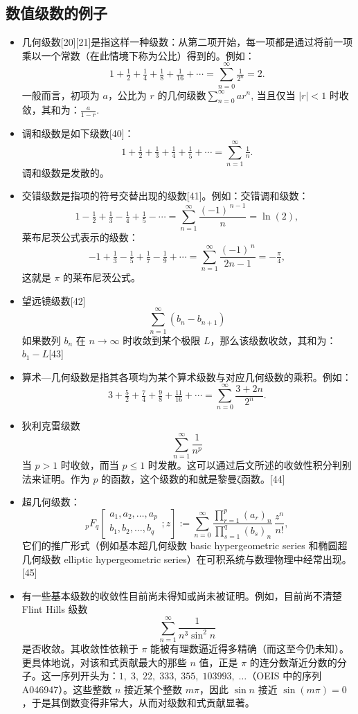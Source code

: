 \subsection{数值级数的例子}
\begin{itemize}
\item 几何级数[20][21]是指这样一种级数：从第二项开始，每一项都是通过将前一项乘以一个常数（在此情境下称为公比）得到的。例如：
$$
1 + \tfrac{1}{2} + \tfrac{1}{4} + \tfrac{1}{8} + \tfrac{1}{16} + \cdots 
= \sum_{n=0}^{\infty} \tfrac{1}{2^{n}} = 2.~
$$
一般而言，初项为 $a$，公比为 $r$ 的几何级数$\sum_{n=0}^{\infty} ar^{n}$,
当且仅当 $|r| < 1$ 时收敛，其和为：$\frac{a}{1-r}$.
\item 调和级数是如下级数[40]：
$$
1 + \tfrac{1}{2} + \tfrac{1}{3} + \tfrac{1}{4} + \tfrac{1}{5} + \cdots 
= \sum_{n=1}^{\infty} \tfrac{1}{n}.~
$$
调和级数是发散的。
\item 交错级数是指项的符号交替出现的级数[41]。例如：交错调和级数：
$$
1 - \tfrac{1}{2} + \tfrac{1}{3} - \tfrac{1}{4} + \tfrac{1}{5} - \cdots 
= \sum_{n=1}^{\infty} \frac{(-1)^{\,n-1}}{n} = \ln(2),~
$$
莱布尼茨公式表示的级数：
$$
-1 + \tfrac{1}{3} - \tfrac{1}{5} + \tfrac{1}{7} - \tfrac{1}{9} + \cdots 
= \sum_{n=1}^{\infty} \frac{(-1)^{\,n}}{2n-1} = -\tfrac{\pi}{4},~
$$
这就是 $\pi$ 的莱布尼茨公式。
\item 望远镜级数[42]
$$
\sum_{n=1}^{\infty} \left(b_{n} - b_{n+1}\right)~
$$
如果数列 $b_{n}$ 在 $n \to \infty$ 时收敛到某个极限 $L$，那么该级数收敛，其和为：$b_{1} - L$[43]  
\item 算术—几何级数是指其各项均为某个算术级数与对应几何级数的乘积。例如：  
$$
3 + \tfrac{5}{2} + \tfrac{7}{4} + \tfrac{9}{8} + \tfrac{11}{16} + \cdots 
= \sum_{n=0}^{\infty} \frac{3+2n}{2^{n}}.~
$$
\item 狄利克雷级数
$$
\sum_{n=1}^{\infty} \frac{1}{n^{p}}~
$$
当 $p > 1$ 时收敛，而当 $p \leq 1$ 时发散。这可以通过后文所述的收敛性积分判别法来证明。作为 $p$ 的函数，这个级数的和就是黎曼ζ函数。[44]
\item 超几何级数：
$$
{}_{p}F_{q}\!\left[ \begin{matrix} a_{1}, a_{2}, \dotsc, a_{p} \\ b_{1}, b_{2}, \dotsc, b_{q} \end{matrix} ; z \right]  
:= \sum_{n=0}^{\infty} \frac{\prod_{r=1}^{p} (a_{r})_{n}}{\prod_{s=1}^{q} (b_{s})_{n}} \, \frac{z^{n}}{n!},~
$$
它们的推广形式（例如基本超几何级数 basic hypergeometric series 和椭圆超几何级数 elliptic hypergeometric series）在可积系统与数理物理中经常出现。[45]
\item 有一些基本级数的收敛性目前尚未得知或尚未被证明。例如，目前尚不清楚Flint Hills 级数
$$
\sum_{n=1}^{\infty} \frac{1}{n^{3} \sin^{2} n}~
$$
是否收敛。其收敛性依赖于 $\pi$ 能被有理数逼近得多精确（而这至今仍未知）。更具体地说，对该和式贡献最大的那些 $n$ 值，正是 $\pi$ 的连分数渐近分数的分子。这一序列开头为：$1, \; 3, \; 22, \; 333, \; 355, \; 103993, \; \dots $（OEIS 中的序列 A046947）。这些整数 $n$ 接近某个整数 $m\pi$，因此 $\sin n$ 接近 $\sin(m\pi) = 0$，于是其倒数变得非常大，从而对级数和式贡献显著。
\end{itemize}



